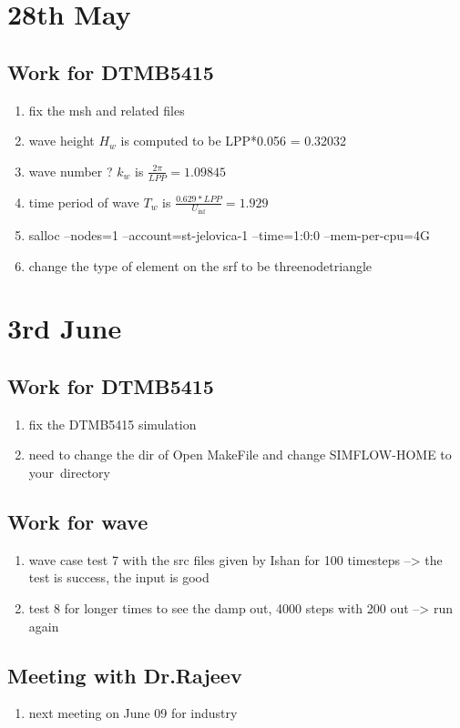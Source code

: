 \documentclass[12pt]{article} %
\begin{document}
\section{28th May}
\subsection{Work for DTMB5415}
\begin{enumerate}
    \item fix the msh and related files
    \item wave height $H_w$ is computed to be LPP*0.056 = 0.32032
    \item wave number ? $k_w$ is $\frac{2\pi}{LPP} = 1.09845$
    \item time period of wave $T_w$ is $\frac{0.629*LPP}{U_{\inf}} = 1.929$
    \item  salloc --nodes=1 --account=st-jelovica-1 --time=1:0:0 --mem-per-cpu=4G
    \item change the type of element on the srf to be threenodetriangle
\end{enumerate}
\section{3rd June}
\subsection{Work for DTMB5415}
\begin{enumerate}
    \item fix the DTMB5415 simulation
    \item need to change the dir of Open MakeFile and change SIMFLOW-HOME to your directory
\end{enumerate}
\subsection{Work for wave}
\begin{enumerate}
    \item wave case test 7 with the src files given by Ishan for 100 timesteps --> the test is success, the input is good
    \item test 8 for longer times to see the damp out, 4000 steps with 200 out --> run again
\end{enumerate}
\subsection{Meeting with Dr.Rajeev}
\begin{enumerate}
    \item next meeting on June 09 for industry
\end{enumerate}
\end{document}
